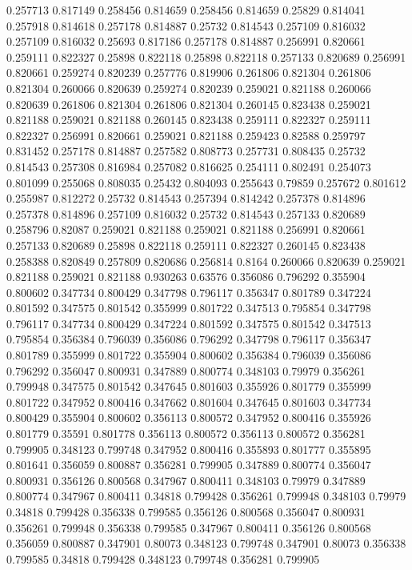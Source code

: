 0.257713 0.817149
0.258456 0.814659
0.258456 0.814659
0.25829 0.814041
0.257918 0.814618
0.257178 0.814887
0.25732 0.814543
0.257109 0.816032
0.257109 0.816032
0.25693 0.817186
0.257178 0.814887
0.256991 0.820661
0.259111 0.822327
0.25898 0.822118
0.25898 0.822118
0.257133 0.820689
0.256991 0.820661
0.259274 0.820239
0.257776 0.819906
0.261806 0.821304
0.261806 0.821304
0.260066 0.820639
0.259274 0.820239
0.259021 0.821188
0.260066 0.820639
0.261806 0.821304
0.261806 0.821304
0.260145 0.823438
0.259021 0.821188
0.259021 0.821188
0.260145 0.823438
0.259111 0.822327
0.259111 0.822327
0.256991 0.820661
0.259021 0.821188
0.259423 0.82588
0.259797 0.831452
0.257178 0.814887
0.257582 0.808773
0.257731 0.808435
0.25732 0.814543
0.257308 0.816984
0.257082 0.816625
0.254111 0.802491
0.254073 0.801099
0.255068 0.808035
0.25432 0.804093
0.255643 0.79859
0.257672 0.801612
0.255987 0.812272
0.25732 0.814543
0.257394 0.814242
0.257378 0.814896
0.257378 0.814896
0.257109 0.816032
0.25732 0.814543
0.257133 0.820689
0.258796 0.82087
0.259021 0.821188
0.259021 0.821188
0.256991 0.820661
0.257133 0.820689
0.25898 0.822118
0.259111 0.822327
0.260145 0.823438
0.258388 0.820849
0.257809 0.820686
0.256814 0.8164
0.260066 0.820639
0.259021 0.821188
0.259021 0.821188
0.930263 0.63576
0.356086 0.796292
0.355904 0.800602
0.347734 0.800429
0.347798 0.796117
0.356347 0.801789
0.347224 0.801592
0.347575 0.801542
0.355999 0.801722
0.347513 0.795854
0.347798 0.796117
0.347734 0.800429
0.347224 0.801592
0.347575 0.801542
0.347513 0.795854
0.356384 0.796039
0.356086 0.796292
0.347798 0.796117
0.356347 0.801789
0.355999 0.801722
0.355904 0.800602
0.356384 0.796039
0.356086 0.796292
0.356047 0.800931
0.347889 0.800774
0.348103 0.79979
0.356261 0.799948
0.347575 0.801542
0.347645 0.801603
0.355926 0.801779
0.355999 0.801722
0.347952 0.800416
0.347662 0.801604
0.347645 0.801603
0.347734 0.800429
0.355904 0.800602
0.356113 0.800572
0.347952 0.800416
0.355926 0.801779
0.35591 0.801778
0.356113 0.800572
0.356113 0.800572
0.356281 0.799905
0.348123 0.799748
0.347952 0.800416
0.355893 0.801777
0.355895 0.801641
0.356059 0.800887
0.356281 0.799905
0.347889 0.800774
0.356047 0.800931
0.356126 0.800568
0.347967 0.800411
0.348103 0.79979
0.347889 0.800774
0.347967 0.800411
0.34818 0.799428
0.356261 0.799948
0.348103 0.79979
0.34818 0.799428
0.356338 0.799585
0.356126 0.800568
0.356047 0.800931
0.356261 0.799948
0.356338 0.799585
0.347967 0.800411
0.356126 0.800568
0.356059 0.800887
0.347901 0.80073
0.348123 0.799748
0.347901 0.80073
0.356338 0.799585
0.34818 0.799428
0.348123 0.799748
0.356281 0.799905
